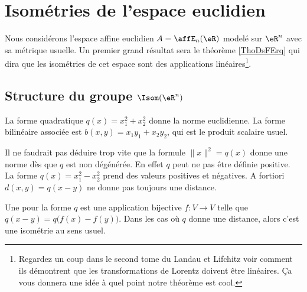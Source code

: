 \section{Isométries de l'espace euclidien}

Nous considérons l'espace affine euclidien \( A=\affE_n(\eR)\) modelé sur \( \eR^n\) avec sa métrique usuelle. Un premier grand résultat sera le théorème \ref{ThoDsFErq} qui dira que les isométries de cet espace sont des applications linéaires\footnote{Regardez un coup dans le second tome du Landau et Lifchitz voir comment ils démontrent que les transformations de Lorentz doivent être linéaires. Ça vous donnera une idée à quel point notre théorème est cool.}.

\subsection{Structure du groupe  \texorpdfstring{\( \Isom(\eR^n)\)}{Isom(Rn)} }

\begin{example}
    La forme quadratique \( q(x)=x_1^2+x_2^2\) donne la norme euclidienne. La forme bilinéaire associée est \( b(x,y)=x_1y_1+x_2y_2\), qui est le produit scalaire usuel.
\end{example}

Il ne faudrait pas déduire trop vite que la formule \( \| x \|^2=q(x)\) donne une norme dès que \( q\) est non dégénérée. En effet \( q\) peut ne pas être définie positive. La forme \( q(x)=x_1^2-x_2^2\) prend des valeurs positives et négatives. A fortiori \( d(x,y)=q(x-y)\) ne donne pas toujours une distance.

\begin{definition}
    Une  pour la forme \( q\) est une application bijective \( f\colon V\to V\) telle que \( q(x-y)=q\big( f(x)-f(y) \big)\). Dans les cas où \( q\) donne une distance, alors c'est une isométrie au sens usuel.
\end{definition}

